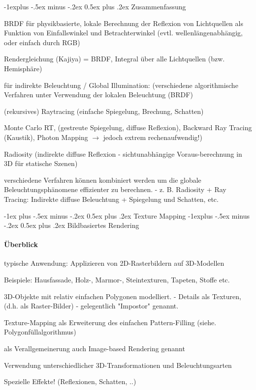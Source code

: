 \documentclass[landscape]{article}
\makeatletter
\renewcommand{\section}{\@startsection{section}{1}{0mm}%
                                {-1ex plus -.5ex minus -.2ex}%
                                {0.5ex plus .2ex}%
                                {\normalfont\large\bfseries}}
\renewcommand{\subsection}{\@startsection{subsection}{2}{0mm}%
                                {-1explus -.5ex minus -.2ex}%
                                {0.5ex plus .2ex}%
                                {\normalfont\normalsize\bfseries}}
\makeatother
\begin{document}
\begin{multicols}{3}
  \subsection{ Zusammenfassung}
  \begin{itemize*}
    \item BRDF für physikbasierte, lokale Berechnung der Reflexion von Lichtquellen als Funktion von Einfallswinkel und Betrachterwinkel (evtl. wellenlängenabhängig, oder einfach durch RGB)
    \item Rendergleichung (Kajiya) = BRDF, Integral über alle Lichtquellen (bzw. Hemisphäre)
    \item für indirekte Beleuchtung / Global Illumination: (verschiedene algorithmische Verfahren unter Verwendung der lokalen Beleuchtung (BRDF)
    \item (rekursives) Raytracing (einfache Spiegelung, Brechung, Schatten)
    \item Monte Carlo RT, (gestreute Spiegelung, diffuse Reflexion), Backward Ray Tracing (Kaustik), Photon Mapping $\rightarrow$ jedoch extrem rechenaufwendig!)
    \item Radiosity (indirekte diffuse Reflexion - sichtunabhängige Voraus-berechnung in 3D für statische Szenen)
    \item verschiedene Verfahren können kombiniert werden um die globale Beleuchtungsphänomene effizienter zu berechnen. - z. B. Radiosity + Ray Tracing: Indirekte diffuse Beleuchtung + Spiegelung und Schatten, etc.
  \end{itemize*}
  
  \section{Texture Mapping}
  \subsection{ Bildbasiertes Rendering}
  \paragraph{Überblick}
  \begin{itemize*}
    \item typische Anwendung: Applizieren von 2D-Rasterbildern auf 3D-Modellen
    \item Beispiele: Hausfassade, Holz-, Marmor-, Steintexturen, Tapeten, Stoffe etc.
    \item 3D-Objekte mit relativ einfachen Polygonen modelliert. - Details als Texturen, (d.h. als Raster-Bilder) - gelegentlich "Impostor" genannt.
    \item Texture-Mapping als Erweiterung des einfachen Pattern-Filling (siehe. Polygonfüllalgorithmus)
    \item als Verallgemeinerung auch Image-based Rendering genannt
    \item Verwendung unterschiedlicher 3D-Transformationen und Beleuchtungsarten
    \item Spezielle Effekte! (Reflexionen, Schatten, ..)
  \end{itemize*}
  

\end{multicols}
\end{document}
